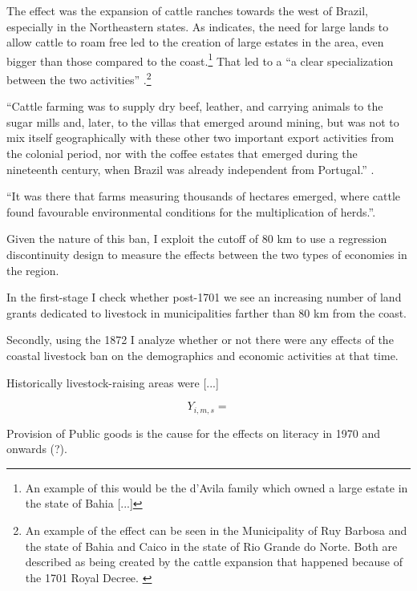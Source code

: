 \documentclass{article}
\begin{document}
The effect was the expansion of cattle ranches towards the west of Brazil, especially in the Northeastern states. 
As \textcite[p~.41]{Fausto2014-bh} indicates, the need for large lands to allow cattle to roam free led to the creation of large estates in the area, even bigger than those compared to the coast.\footnote{An example of this would be the d'Avila family which owned a large estate in the state of Bahia [...]}
That led to a ``a clear specialization between the two activities'' \parencite{Ribeiro2012-lb}.\footnote{An example of the effect can be seen in the Municipality of Ruy Barbosa and the state of Bahia and Caico in the state of Rio Grande do Norte. Both are described as being created by the cattle expansion that happened because of the 1701 Royal Decree. \parencite{UnknownUnknown-ro}}

\parencite[p~.]{Boxer1962-bj}

``Cattle farming was to supply dry beef, leather, and carrying animals to the sugar mills and, later, to the villas that emerged around mining, but was not to mix itself geographically with these other two important export activities from the colonial period, nor with the coffee estates that emerged during the nineteenth century,  when  Brazil was already independent from  Portugal.'' \parencite{Ribeiro2012-lb}.

``It was there that farms measuring thousands of hectares emerged, where cattle found favourable environmental conditions for the multiplication of herds.''\parencite{Ribeiro2012-lb}.


Given the nature of this ban, I exploit the cutoff of 80 km to use a regression discontinuity design to measure the effects between the two types of economies in the region. 

In the first-stage I check whether post-1701 we see an increasing number of land grants dedicated to livestock in municipalities farther than 80 km from the coast. 

Secondly, using the 1872 I analyze whether or not there were any effects of the coastal livestock ban on the demographics and economic activities at that time.




Historically livestock-raising areas were [...]

\begin{equation}
  Y_{i,m,s} = 
\end{equation}

Provision of Public goods is the cause for the effects on literacy in 1970 and onwards (?).
\end{document}

